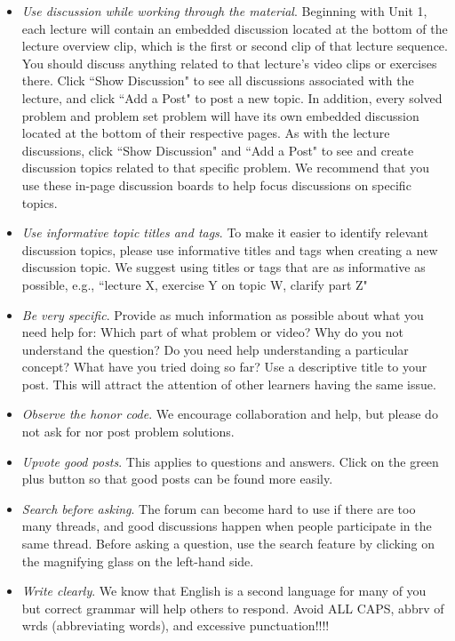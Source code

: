 \documentclass[pdftex, brazil, 12pt, twoside]{article}
\begin{document}
\begin{itemize}[noitemsep]
\item \emph{Use discussion while working through the material}. Beginning with Unit 1,
  each lecture will contain an embedded discussion located at the bottom of the lecture
  overview clip, which is the first or second clip of that lecture sequence. You should
  discuss anything related to that lecture's video clips or exercises there. Click
  “Show Discussion" to see all discussions associated with the lecture, and click
  “Add a Post" to post a new topic. In addition, every solved problem and problem set
  problem will have its own embedded discussion located at the bottom of their respective
  pages. As with the lecture discussions, click “Show Discussion" and “Add a Post" to
  see and create discussion topics related to that specific problem. We recommend that
  you use these in-page discussion boards to help focus discussions on specific topics.
\item \emph{Use informative topic titles and tags}. To make it easier to identify relevant
  discussion topics, please use informative titles and tags when creating a new discussion
  topic. We suggest using titles or tags that are as informative as possible, e.g.,
  “lecture X, exercise Y on topic W, clarify part Z"
\item \emph{Be very specific}. Provide as much information as possible about what you need
  help for: Which part of what problem or video? Why do you not understand the question?
  Do you need help understanding a particular concept? What have you tried doing so far?
  Use a descriptive title to your post. This will attract the attention of other learners
  having the same issue.
\item \emph{Observe the honor code}. We encourage collaboration and help, but please do
  not ask for nor post problem solutions.
\item \emph{Upvote good posts}. This applies to questions and answers. Click on the green
  plus button so that good posts can be found more easily.
\item \emph{Search before asking}. The forum can become hard to use if there are too many
  threads, and good discussions happen when people participate in the same thread. Before
  asking a question, use the search feature by clicking on the magnifying glass on the
  left-hand side.
\item \emph{Write clearly}. We know that English is a second language for many of you but
  correct grammar will help others to respond. Avoid ALL CAPS, abbrv of wrds (abbreviating
  words), and excessive punctuation!!!!
\end{itemize}
\end{document}
